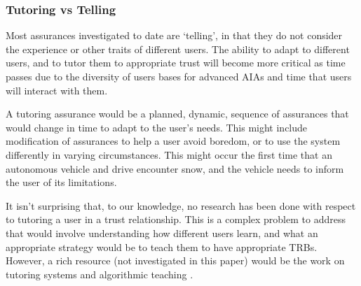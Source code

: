 \subsubsection{Tutoring vs Telling} \label{sec:teach_tell}
Most assurances investigated to date are `telling', in that they do not consider the experience or other traits of different users. The ability to adapt to different users, and to tutor them to appropriate trust will become more critical as time passes due to the diversity of users bases for advanced AIAs and time that users will interact with them.

A tutoring assurance would be a planned, dynamic, sequence of assurances that would change in time to adapt to the user's needs. This might include modification of assurances to help a user avoid boredom, or to use the system differently in varying circumstances. This might occur the first time that an autonomous vehicle and drive encounter snow, and the vehicle needs to inform the user of its limitations.

It isn't surprising that, to our knowledge, no research has been done with respect to tutoring a user in a trust relationship. This is a complex problem to address that would involve understanding how different users learn, and what an appropriate strategy would be to teach them to have appropriate TRBs. However, a rich resource (not investigated in this paper) would be the work on tutoring systems \citet{Wenger2014-ld} and algorithmic teaching \citet{Balbach2009-jw}.
